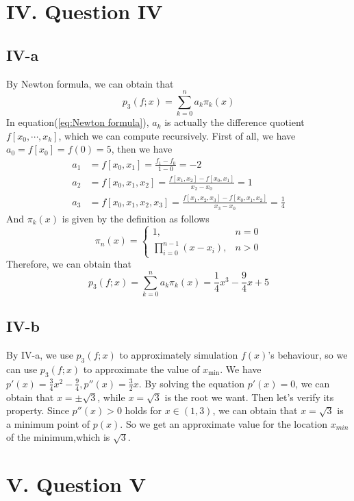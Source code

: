 \documentclass[a4paper]{article}
\begin{document}
\section*{IV. Question IV}
\subsection*{IV-a}
By Newton formula, we can obtain that
\begin{equation}
  p_3(f;x)=\sum_{k=0}^n a_k\pi_k(x) \label{eq:Newton formula}
\end{equation}
In equation(\ref{eq:Newton formula}), $a_k$ is actually the difference quotient $f[x_0,\cdots,x_k]$, which we 
can compute recursively. First of all, we have $a_0=f[x_0]=f(0)=5$, then we have
\begin{align}
  a_1&=f[x_0,x_1]=\frac{f_1-f_0}{1-0}=-2  \\
  a_2&=f[x_0,x_1,x_2]=\frac{f[x_1,x_2]-f[x_0,x_1]}{x_2-x_0}=1  \\
  a_3&=f[x_0,x_1,x_2,x_3]=\frac{f[x_1,x_2,x_3]-f[x_0,x_1,x_2]}{x_3-x_0}=\frac{1}{4}
\end{align}
And $\pi_k(x)$ is given by the definition as follows
\begin{equation}
  \pi_n(x)=\begin{cases}
    1,&n=0\\
    \prod_{i=0}^{n-1}(x-x_i),&n>0
  \end{cases}
\end{equation}
Therefore, we can obtain that
\begin{equation}
  p_3(f;x)=\sum_{k=0}^na_k\pi_{k}(x)=\frac{1}{4}x^3-\frac{9}{4}x+5
\end{equation}
\subsection*{IV-b}
By IV-a, we use $p_3(f;x)$ to approximately simulation $f(x)$'s behaviour, so we can use $p_3(f;x)$ to approximate the value of $x_{\text{min}}$.
We have $p'(x)=\frac{3}{4}x^2-\frac{9}{4},p''(x)=\frac{3}{2}x$. By solving the equation $p'(x)=0$, we can obtain that $x=\pm \sqrt{3}$, while $x=\sqrt{3}$ is the root we want.
Then let's verify its property. Since $p''(x)>0$ holds for $x\in(1,3)$, we can obtain that $x=\sqrt{3}$ is a minimum point of $p(x)$. So we get an approximate value for the location $x_{min}$ of the minimum,which is $\sqrt{3}$.
\section*{V. Question V}
\end{document}
